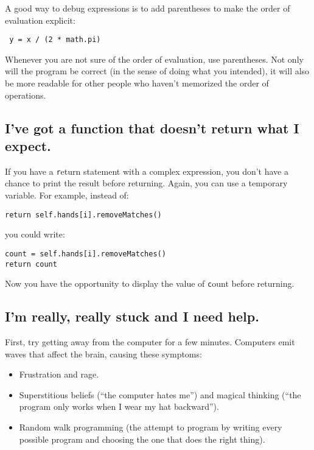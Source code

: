 \documentclass[
DIV=11,
fontsize=13,
twoside,
headinclude=false,
titlepage=firstiscover,
abstract=true,
headsepline=true,
footsepline=true,
chapterprefix=true, %
headings=big,
bibliography=totoc,%
captions=tableheading
]{scrbook}
\theoremstyle{definition}
\begin{document}
A good way to debug expressions is to add parentheses to make
the order of evaluation explicit:

\begin{lstlisting}
 y = x / (2 * math.pi)
\end{lstlisting}
%
Whenever you are not sure of the order of evaluation, use
parentheses.  Not only will the program be correct (in the sense
of doing what you intended), it will also be more readable for
other people who haven't memorized the order of operations.


\subsection{I've got a function that doesn't return what I
expect.}

If you have a {\texttt return} statement with a complex expression,
you don't have a chance to print the result before
returning.  Again, you can use a temporary variable.  For
example, instead of:

\begin{lstlisting}
return self.hands[i].removeMatches()
\end{lstlisting}
%
you could write:

\begin{lstlisting}
count = self.hands[i].removeMatches()
return count
\end{lstlisting}
%
Now you have the opportunity to display the value of
{\texttt count} before returning.


\subsection{I'm really, really stuck and I need help.}

First, try getting away from the computer for a few minutes.
Computers emit waves that affect the brain, causing these
symptoms:

\begin{itemize}

\item Frustration and rage.

\item Superstitious beliefs (``the computer hates me'') and
magical thinking (``the program only works when I wear my
hat backward'').

\item Random walk programming (the attempt to program by writing
every possible program and choosing the one that does the right
thing).

\end{itemize}
\end{document}
